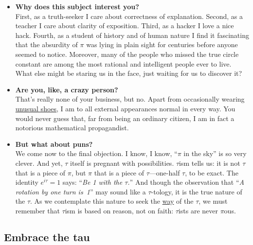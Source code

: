 \begin{itemize}
  \item \textbf{Why does this subject interest you?} \\ First, as a truth-seeker I care about correctness of explanation. Second, as a teacher I care about clarity of exposition. Third, as a hacker I love a nice hack. Fourth, as a student of history and of human nature I find it fascinating that the absurdity of $\pi$ was lying in plain sight for centuries before anyone seemed to notice. Moreover, many of the people who missed the true circle constant are among the most rational and intelligent people ever to live. What else might be staring us in the face, just waiting for us to discover it?

  \item \textbf{Are you, like, a crazy person?} \\ That's really none of your business, but no. Apart from occasionally wearing \href{http://www.vibramfivefingers.com/}{unusual shoes}, I am to all external appearances normal in every way. You would never guess that, far from being an ordinary citizen, I am in fact a notorious mathematical propagandist.

  \item \textbf{But what about puns?} \\ We come now to the final objection. I know, I know, ``$\pi$ in the sky'' is so very clever. And yet, $\tau$ itself is pregnant with possibilities. $\tau$ism tells us: it is not $\tau$ that is a piece of $\pi$, but $\pi$ that is a piece of $\tau$---one-half $\tau$, to be exact. The identity $e^{i\tau} = 1$ says: ``\emph{Be 1 with the $\tau$.}'' And though the observation that ``\emph{A rotation by one turn is~1}'' may sound like a $\tau$-tology, it is the true nature of the $\tau$. As we contemplate this nature to seek the \href{https://en.wikipedia.org/wiki/Tao}{way} of the $\tau$, we must remember that $\tau$ism is based on reason, not on faith: $\tau$ists are never $\pi$ous.

\end{itemize}


  \subsection{Embrace the tau} %
  \label{sec:embrace_the_tau}

